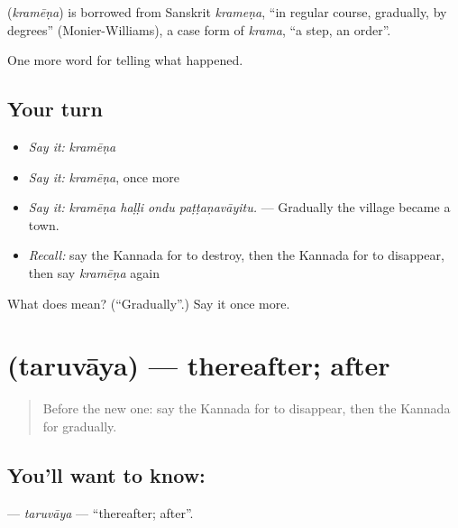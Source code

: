\begin{cousinweb}
\textbf{} (\emph{kramēṇa}) is borrowed from Sanskrit \emph{krameṇa}, \textquotedblleft{}in regular course, gradually, by degrees\textquotedblright{} (Monier-Williams), a case form of \emph{krama}, \textquotedblleft{}a step, an order\textquotedblright{}.
\end{cousinweb}

\begin{grammarlens}[title={What you've built}]
One more word for telling what happened.
\end{grammarlens}

\subsection*{Your turn}
\begin{itemize}
\raggedright
  \item \emph{Say it:} \emph{kramēṇa}
  \item \emph{Say it:} \emph{kramēṇa}, once more
  \item \emph{Say it:} \emph{kramēṇa haḷḷi ondu paṭṭaṇavāyitu.} — Gradually the village became a town.
  \item \emph{Recall:} say the Kannada for to destroy, then the Kannada for to disappear, then say \emph{kramēṇa} again
\end{itemize}

\begin{tcolorbox}[breakable,colback=teal!4,colframe=teal!35!black,title={Before you move on}]
What does  mean? (\textquotedblleft{}Gradually\textquotedblright{}.) Say it once more.
\end{tcolorbox}
\section[\texorpdfstring{\kn{ತರುವಾಯ} (taruvāya)}{ತರುವಾಯ (taruvāya)}]{ (taruvāya) — thereafter; after}

\label{lesson:KA-C368-taruvaya}



\begin{quote}
Before the new one: say the Kannada for to disappear, then the Kannada for gradually.
\end{quote}

\subsection*{You'll want to know: }
\textbf{} — \emph{taruvāya} — \textquotedblleft{}thereafter; after\textquotedblright{}.

